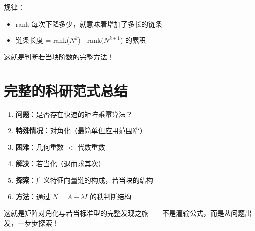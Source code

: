 \documentclass[12pt,a4paper]{article}
\begin{document}
规律：
\begin{itemize}
    \item rank 每次下降多少，就意味着增加了多长的链条
    \item 链条长度 = rank($N^k$) - rank($N^{k+1}$) 的累积
\end{itemize}

这就是判断若当块阶数的完整方法！


\section{完整的科研范式总结}

\begin{enumerate}
    \item \textbf{问题}：是否存在快速的矩阵乘幂算法？
    \item \textbf{特殊情况}：对角化（最简单但应用范围窄）
    \item \textbf{困难}：几何重数 $<$ 代数重数
    \item \textbf{解决}：若当化（退而求其次）
    \item \textbf{探索}：广义特征向量链的构成，若当块的结构
    \item \textbf{方法}：通过 $N = A - \lambda I$ 的秩判断结构
\end{enumerate}

这就是矩阵对角化与若当标准型的完整发现之旅——不是灌输公式，而是从问题出发，一步步探索！
\end{document}
